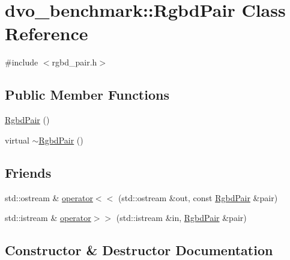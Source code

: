 \hypertarget{classdvo__benchmark_1_1_rgbd_pair}{}\section{dvo\+\_\+benchmark\+:\+:Rgbd\+Pair Class Reference}
\label{classdvo__benchmark_1_1_rgbd_pair}


{\ttfamily \#include $<$rgbd\+\_\+pair.\+h$>$}

\subsection*{Public Member Functions}
\begin{DoxyCompactItemize}
\item 
\mbox{\hyperlink{classdvo__benchmark_1_1_rgbd_pair_a061cd563ece274d426734c5cc1e5da2e}{Rgbd\+Pair}} ()
\item 
virtual \mbox{\hyperlink{classdvo__benchmark_1_1_rgbd_pair_a248ac100565f5fdac27ac3ce030a90b6}{$\sim$\+Rgbd\+Pair}} ()
\end{DoxyCompactItemize}
\subsection*{Friends}
\begin{DoxyCompactItemize}
\item 
std\+::ostream \& \mbox{\hyperlink{classdvo__benchmark_1_1_rgbd_pair_a7309c27c80c3c07f52094a16a90d2f56}{operator$<$$<$}} (std\+::ostream \&out, const \mbox{\hyperlink{classdvo__benchmark_1_1_rgbd_pair}{Rgbd\+Pair}} \&pair)
\item 
std\+::istream \& \mbox{\hyperlink{classdvo__benchmark_1_1_rgbd_pair_ab3c51d87c4c55843e497ae35f969f85a}{operator$>$$>$}} (std\+::istream \&in, \mbox{\hyperlink{classdvo__benchmark_1_1_rgbd_pair}{Rgbd\+Pair}} \&pair)
\end{DoxyCompactItemize}


\subsection{Constructor \& Destructor Documentation}
\mbox{\label{classdvo__benchmark_1_1_rgbd_pair_a061cd563ece274d426734c5cc1e5da2e}} 
